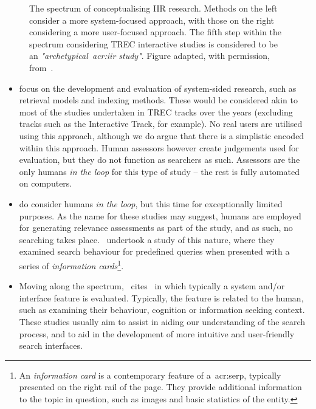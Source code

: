 \begin{figure}[t!]
    \centering
    \caption[Spectrum IIR research~\citep{kelly2009iir}]{The spectrum of conceptualising IIR research. Methods on the left consider a more system-focused approach, with those on the right considering a more user-focused approach. The fifth step within the spectrum considering TREC interactive studies is considered to be an \emph{"archetypical~\gls{acr:iir} study"}. Figure adapted, with permission, from~\cite{kelly2009iir}.}
    \label{fig:spectrum}
\end{figure}

\begin{itemize}
    
    \item[\emph{(1)}]{ focus on the development and evaluation of system-sided research, such as retrieval models and indexing methods. These would be considered akin to most of the studies undertaken in TREC tracks over the years (excluding tracks such as the Interactive Track, for example). No real users are utilised using this approach, although we do argue that there is a simplistic  encoded within this approach. Human assessors however create judgements used for evaluation, but they do not function as searchers as such. Assessors are the only humans \emph{in the loop} for this type of study -- the rest is fully automated on computers.}
    
    \item[\emph{(2)}]{ do consider humans \emph{in the loop}, but this time for exceptionally limited purposes. As the name for these studies may suggest, humans are employed for generating relevance assessments as part of the study, and as such, no searching takes place.~\cite{bota2016cards} undertook a study of this nature, where they examined search behaviour for predefined queries when presented with a series of \emph{information cards}\footnote{An \emph{information card} is a contemporary feature of a~\gls{acr:serp}, typically presented on the right rail of the page. They provide additional information to the topic in question, such as images and basic statistics of the entity.}}.
    
    \item[\emph{(5)}]{Moving along the spectrum,~\cite{kelly2009iir} cites~ in which typically a system and/or interface feature is evaluated. Typically, the feature is related to the human, such as examining their behaviour, cognition or information seeking context. These studies usually aim to assist in aiding our understanding of the search process, and to aid in the development of more intuitive and user-friendly search interfaces.}
    
\end{itemize}

